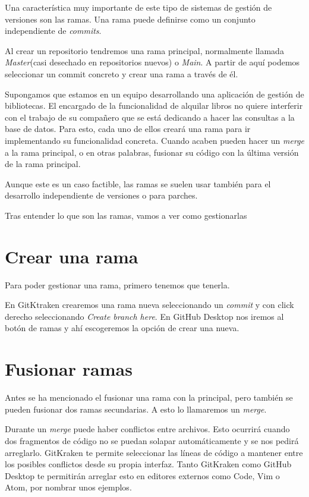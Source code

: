 
Una característica muy importante de este tipo de sistemas de gestión de versiones son las ramas. Una rama puede definirse como un conjunto independiente de \textit{commits}.

Al crear un repositorio tendremos una rama principal, normalmente llamada \textit{Master}(casi desechado en repositorios nuevos) o \textit{Main}. A partir de aquí podemos seleccionar un commit concreto y crear una rama a través de él.

Supongamos que estamos en un equipo desarrollando una aplicación de gestión de bibliotecas. El encargado de la funcionalidad de alquilar libros no quiere interferir con el trabajo de su compañero que se está dedicando a hacer las consultas a la base de datos.
Para esto, cada uno de ellos creará una rama para ir implementando su funcionalidad concreta. Cuando acaben pueden hacer un \textit{merge} a la rama principal, o en otras palabras, fusionar su código con la última versión de la rama principal.

Aunque este es un caso factible, las ramas se suelen usar también para el desarrollo independiente de versiones o para parches.

Tras entender lo que son las ramas, vamos a ver como gestionarlas

\section{Crear una rama}

Para poder gestionar una rama, primero tenemos que tenerla.

En GitKtraken crearemos una rama nueva seleccionando un \textit{commit} y con click derecho seleccionando \textit{Create branch here}.
En GitHub Desktop nos iremos al botón de ramas y ahí escogeremos la opción de crear una nueva.

\section{Fusionar ramas}

Antes se ha mencionado el fusionar una rama con la principal, pero también se pueden fusionar dos ramas secundarias. A esto lo llamaremos un \textit{merge}.

Durante un \textit{merge} puede haber conflictos entre archivos. Esto ocurrirá cuando dos fragmentos de código no se puedan solapar automáticamente y se nos pedirá arreglarlo.
GitKraken te permite seleccionar las líneas de código a mantener entre los posibles conflictos desde su propia interfaz. Tanto GitKraken como GitHub Desktop te permitirán arreglar esto en editores externos como Code, Vim o Atom, por nombrar unos ejemplos.

